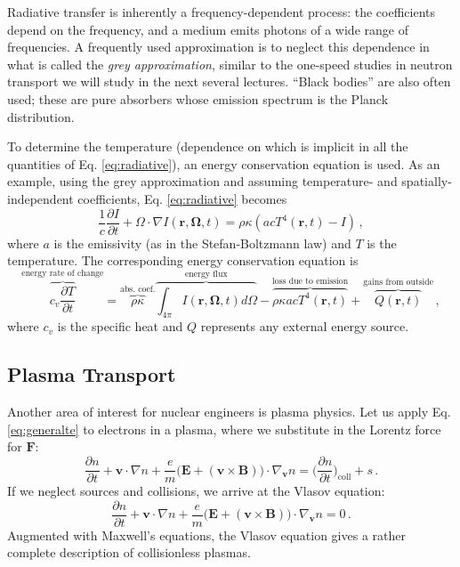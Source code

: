Radiative transfer is inherently a frequency-dependent process: the coefficients depend on the frequency, and a medium emits photons of a wide range of frequencies.  A frequently used approximation is to neglect this dependence in what is called the \textit{grey approximation}, similar to the one-speed studies in neutron transport we will study in the next several lectures.  ``Black bodies'' are also often used; these are pure absorbers whose emission spectrum is the Planck distribution.

To determine the temperature (dependence on which is implicit in all the quantities of Eq. \ref{eq:radiative}), an energy conservation equation is used.  As an example, using the grey approximation and assuming temperature- and spatially-independent coefficients, Eq. \ref{eq:radiative} becomes
\begin{equation}
 \frac{1}{c}\frac{\partial I}{\partial t} + \Omega \cdot \nabla I(\mathbf{r},\mathbf{\Omega},t) = \rho \kappa (acT^4(\mathbf{r},t)- I) \, ,
 \label{eq:radiativegrey}
\end{equation}
where $a$ is the emissivity (as in the Stefan-Boltzmann law) and $T$ is the temperature.  The corresponding energy conservation equation is
\begin{equation}
 \overbrace{c_v \frac{\partial T}{\partial t}}^{\text{energy rate of change}} = \overbrace{\rho \kappa}^{\text{abs. coef.}} \overbrace{\int_{4\pi} I(\mathbf{r},\mathbf{\Omega},t) d\Omega}^{\text{energy flux}} - \overbrace{\rho \kappa a c T^4(\mathbf{r},t)}^{\text{loss due to emission}} + \overbrace{Q(\mathbf{r},t)}^{\text{gains from outside}} \, ,
\end{equation}
where $c_v$ is the specific heat and $Q$ represents any external energy source.


\subsection*{Plasma Transport}

Another area of interest for nuclear engineers is plasma physics.  Let us apply Eq. \ref{eq:generalte} to electrons in a plasma, where we substitute in the Lorentz force for $\mathbf{F}$:
\begin{equation}
  \frac{\partial n}{\partial t} 
   + \mathbf{v} \cdot \nabla n + \frac{e}{m} \Big ( \mathbf{E}+(\mathbf{v}\times \mathbf{B} ) \Big ) \cdot \nabla_{\mathbf{v}} n =   \Big( \frac{\partial n}{\partial t} \Big )_{\mathrm{coll}} +  s \, .
\end{equation}
If we neglect sources and collisions, we arrive at the Vlasov equation:
\begin{equation}
  \frac{\partial n}{\partial t} 
   + \mathbf{v} \cdot \nabla n + \frac{e}{m} \Big ( \mathbf{E}+(\mathbf{v}\times \mathbf{B} ) \Big ) \cdot \nabla_{\mathbf{v}} n =  0 \, .
\end{equation}
Augmented with Maxwell's equations, the Vlasov equation gives a rather complete description of collisionless plasmas.  



